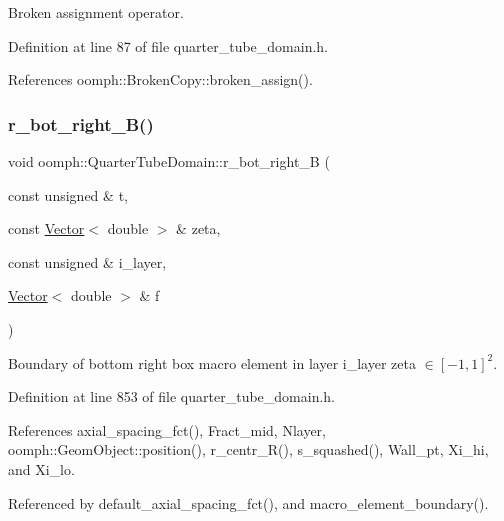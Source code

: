 Broken assignment operator. 



Definition at line 87 of file quarter\+\_\+tube\+\_\+domain.\+h.



References oomph\+::\+Broken\+Copy\+::broken\+\_\+assign().

\mbox{\label{classoomph_1_1QuarterTubeDomain_aef8a75f0a0790e2a43f2702524a48e60}} 
\subsubsection{\texorpdfstring{r\+\_\+bot\+\_\+right\+\_\+\+B()}{r\_bot\_right\_B()}}
{\footnotesize\ttfamily void oomph\+::\+Quarter\+Tube\+Domain\+::r\+\_\+bot\+\_\+right\+\_\+B (\begin{DoxyParamCaption}\item[{const unsigned \&}]{t,  }\item[{const \hyperlink{classoomph_1_1Vector}{Vector}$<$ double $>$ \&}]{zeta,  }\item[{const unsigned \&}]{i\+\_\+layer,  }\item[{\hyperlink{classoomph_1_1Vector}{Vector}$<$ double $>$ \&}]{f }\end{DoxyParamCaption})\hspace{0.3cm}{\ttfamily [private]}}



Boundary of bottom right box macro element in layer i\+\_\+layer zeta $ \in [-1,1]^2 $. 



Definition at line 853 of file quarter\+\_\+tube\+\_\+domain.\+h.



References axial\+\_\+spacing\+\_\+fct(), Fract\+\_\+mid, Nlayer, oomph\+::\+Geom\+Object\+::position(), r\+\_\+centr\+\_\+\+R(), s\+\_\+squashed(), Wall\+\_\+pt, Xi\+\_\+hi, and Xi\+\_\+lo.



Referenced by default\+\_\+axial\+\_\+spacing\+\_\+fct(), and macro\+\_\+element\+\_\+boundary().

\mbox{\label{classoomph_1_1QuarterTubeDomain_a8f4332d868af0473ec2591790e8498ae}} 
